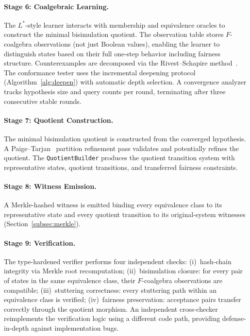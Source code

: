 \documentclass[11pt]{article}
\begin{document}
\paragraph{Stage 6: Coalgebraic Learning.}
The $L^*$-style learner interacts with membership and equivalence oracles
to construct the minimal bisimulation quotient.
The observation table stores $F$-coalgebra observations (not just Boolean
values), enabling the learner to distinguish states based on their full
one-step behavior including fairness structure.
Counterexamples are decomposed via the Rivest--Schapire
method~\cite{RivestS93}.
The conformance tester uses the incremental deepening protocol
(Algorithm~\ref{alg:deepen}) with automatic depth selection.
A convergence analyzer tracks hypothesis size and query counts per round,
terminating after three consecutive stable rounds.

\paragraph{Stage 7: Quotient Construction.}
The minimal bisimulation quotient is constructed from the converged
hypothesis.
A Paige--Tarjan~\cite{PaigeTarjan87} partition refinement pass validates
and potentially refines the quotient.
The \texttt{QuotientBuilder} produces the quotient transition system
with representative states, quotient transitions, and transferred fairness
constraints.

\paragraph{Stage 8: Witness Emission.}
A Merkle-hashed witness is emitted binding every equivalence class to its
representative state and every quotient transition to its original-system
witnesses (Section~\ref{subsec:merkle}).

\paragraph{Stage 9: Verification.}
The type-hardened verifier performs four independent checks:
(i)~hash-chain integrity via Merkle root recomputation;
(ii)~bisimulation closure: for every pair of states in the same
equivalence class, their $F$-coalgebra observations are compatible;
(iii)~stuttering correctness: every stuttering path within an equivalence
class is verified;
(iv)~fairness preservation: acceptance pairs transfer correctly through
the quotient morphism.
An independent cross-checker reimplements the verification logic using
a different code path, providing defense-in-depth against implementation
bugs.
\end{document}
